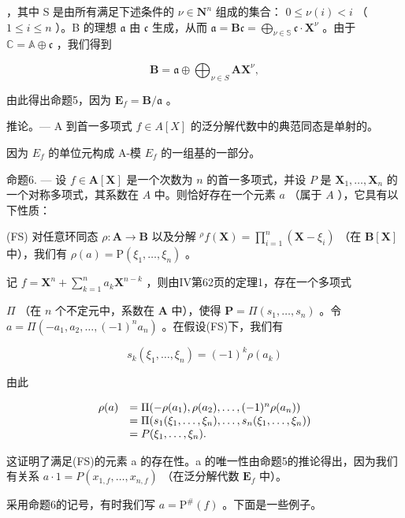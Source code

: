 ，其中 S 是由所有满足下述条件的 \(\nu \in \mathbf{N}^n\) 组成的集合： \(0 \leqslant \nu(i) < i\) （ \(1 \leqslant i \leqslant n\) ）。B 的理想 \(\mathfrak{a}\) 由 \(\mathfrak{c}\) 生成，从而 \(\mathfrak{a} = \mathbf{B}\mathfrak{c} = \bigoplus_{\nu \in \mathbb{S}} \mathfrak{c} \cdot \mathbf{X}^\nu\) 。由于 \(\mathbb{C} = \mathbb{A} \oplus \mathfrak{c}\) ，我们得到

\[
\mathbf {B} = \mathfrak {a} \oplus \bigoplus_ {\nu \in S} \mathbf {A X} ^ {\nu},
\]

由此得出命题5，因为 \(\mathbf{E}_f = \mathbf{B} / \mathfrak{a}\) 。

推论。--- A 到首一多项式 \(f \in A[X]\) 的泛分解代数中的典范同态是单射的。

因为 \(E_{f}\) 的单位元构成 A-模 \(E_{f}\) 的一组基的一部分。

命题6. --- 设 \(f \in \mathbf{A}[\mathbf{X}]\) 是一个次数为 \(n\) 的首一多项式，并设 \(P\) 是 \(\mathbf{X}_1, \ldots, \mathbf{X}_n\) 的一个对称多项式，其系数在 \(A\) 中。则恰好存在一个元素 \(a\) （属于 \(A\) ），它具有以下性质：

(FS) 对任意环同态 \(\rho: \mathbf{A} \to \mathbf{B}\) 以及分解 \({}^{\rho} f(\mathbf{X}) = \prod_{i=1}^{n} (\mathbf{X} - \xi_i)\) （在 \(\mathbf{B}[\mathbf{X}]\) 中），我们有 \(\rho(a) = \mathrm{P}(\xi_1, \ldots, \xi_n)\) 。

记 \(f = \mathbf{X}^n + \sum_{k=1}^{n} a_k \mathbf{X}^{n-k}\) ，则由IV第62页的定理1，存在一个多项式

\(\Pi\) （在 \(n\) 个不定元中，系数在 \(\mathbf{A}\) 中），使得 \(\mathbf{P} = \Pi(s_1, \ldots, s_n)\) 。令 \(a = \Pi(-a_1, a_2, \ldots, (-1)^n a_n)\) 。在假设(FS)下，我们有

\[
s _ {k} (\xi_ {1}, \dots , \xi_ {n}) = (- 1) ^ {k} \rho (a _ {k})
\]

由此

\[
\begin{array}{r l} \rho (a) & = \Pi (- \rho (a _ {1}), \rho (a _ {2}), \dots , (- 1) ^ {n} \rho (a _ {n})) \\ & = \Pi (s _ {1} (\xi_ {1}, \dots , \xi_ {n}), \dots , s _ {n} (\xi_ {1}, \dots , \xi_ {n})) \\ & = P (\xi_ {1}, \dots , \xi_ {n}). \end{array}
\]

这证明了满足(FS)的元素 a 的存在性。a 的唯一性由命题5的推论得出，因为我们有关系 \(a \cdot 1 = P(x_{1,f}, \ldots, x_{n,f})\) （在泛分解代数 \(\mathbf{E}_f\) 中）。

采用命题6的记号，有时我们写 \(a = \mathrm{P}^{\#}(f)\) 。下面是一些例子。

